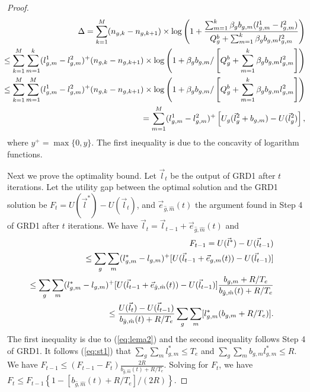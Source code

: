 \documentclass[12pt,onecolumn,draftclsnofoot]{IEEEtran} %
\begin{document}
\begin{proof}
\begin{eqnarray}\label{eq:lema2}
& & \hspace{-0.2in} \Delta = \sum_{k=1}^M (n_{g,k}-n_{g,k+1}) \times \log \left( 1 + \frac{ \sum_{m=1}^k \beta_g b_{g,m}(l_{g,m}^1-l_{g,m}^2) }{ Q^b_g + \sum_{m=1}^k \beta_g b_{g,m} l_{g,m}^2 } \right) \nonumber  \\
& & \hspace{-0.2in} \le \sum_{k=1}^M \sum_{m=1}^k (l_{g,m}^1-l_{g,m}^2)^+(n_{g,k}-n_{g,k+1}) \times \log \left( 1+ \beta_g b_{g,m} / \left[ Q^b_g+\sum_{m=1}^k \beta_g b_{g,m} l_{g,m}^2 \right] \right) \nonumber \\
& & \hspace{-0.2in} \le \sum_{k=1}^M \sum_{m=1}^M (l_{g,m}^1-l_{g,m}^2)^+(n_{g,k}-n_{g,k+1}) \times  \log \left( 1 + \beta_g b_{g,m} / \left[ Q^b_g + \sum_{m=1}^k \beta_g b_{g,m} l_{g,m}^2 \right] \right) \nonumber\\
& & \hspace{-0.2in} = \sum_{m=1}^M (l_{g,m}^1-l_{g,m}^2)^+ \left[ U_g(\vec{l}^2_g+b_{g,m})-U(\vec{l}^2_g) \right],
\end{eqnarray}
where $y^+=\max \{ 0, y \}$. The first inequality is due to the concavity of logarithm functions. 

Next we prove the optimality bound. Let $\vec{l}_{t}$ be the output of GRD1 after $t$ iterations. Let the utility gap between the optimal solution and the GRD1 solution be $F_{t} = U(\vec{l}^{\ast}) - U(\vec{l}_{t})$, and $\vec{e}_{\hat{g},\hat{m}}(t)$ the argument found in Step 4 of GRD1 after $t$ iterations. We have $\vec{l}_{t} = \vec{l}_{t-1} + \vec{e}_{\hat{g}, \hat{m}}(t)$ and
\begin{eqnarray}
 & & \hspace{-0.1in} F_{t-1} = U(\vec{l}^{\ast})-U(\vec{l}_{t-1}) \nonumber \\
 & & \hspace{-0.3in} \le \sum_g\sum_m (l_{g,m}^{\ast}-l_{g,m})^{+}
[U(\vec{l}_{t-1}+\vec{e}_{g,m}(t))-U(\vec{l}_{t-1})] \nonumber \\
 & & \hspace{-0.3in} \le \sum_g\sum_m (l_{g,m}^{\ast}-l_{g,m})^{+} [U(\vec{l}_{t-1}+\vec{e}_{\hat{g},\hat{m}}(t))- U(\vec{l}_{t-1})]
\frac{b_{g,m}+R/T_e}{b_{\hat{g},\hat{m}}(t)+R/T_e}\nonumber \\
 & & \hspace{-0.3in} \le \frac{U(\vec{l}_t)-U(\vec{l}_{t-1})}{ b_{\hat{g}, \hat{m}}(t) + R/T_e}
\sum_g\sum_m [l_{g,m}^{\ast}(b_{g,m}+R/T_e)]. \nonumber
\end{eqnarray}
The first inequality is due to (\ref{eq:lema2}) and the second inequality follows Step 4 of GRD1.  It follows (\ref{eq:st1}) that $\sum_g\sum_m l_{g,m}^{\ast} \le T_e$ and $\sum_g\sum_m b_{g,m}l_{g,m}^{\ast} \le R$.  We have $F_{t-1} \le (F_{t-1}-F_{t}) \frac{2R}{b_{\hat{g}, \hat{m}}(t)+R/T_e}$.  Solving for $F_t$, we have $F_{t}\le F_{t-1} \left\{ 1 - \left[ b_{\hat{g},\hat{m}}(t)+R/T_e \right] / (2R) \right\}$. 


\end{proof}
\end{document}
